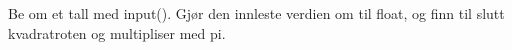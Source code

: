 %
%
Be om et tall med input(). Gjør den innleste verdien om til float, og finn til slutt kvadratroten og multipliser med pi.
